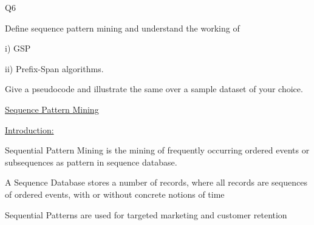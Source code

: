 \documentclass[12pt]{article}
\renewcommand{\_}{\kern-1.5pt\textunderscore\kern-1.5pt}
\begin{document}
\vspace{\baselineskip}
\begin{Center}
{\fontsize{28pt}{33.6pt}\selectfont Q6\par}
\end{Center}\par

{\fontsize{14pt}{16.8pt}\selectfont Define sequence pattern mining and understand the working of \par}\par

{\fontsize{14pt}{16.8pt}\selectfont i) GSP\par}\par

{\fontsize{14pt}{16.8pt}\selectfont ii) Prefix-Span algorithms.\par}\par

{\fontsize{14pt}{16.8pt}\selectfont Give a pseudocode and illustrate the same over a sample dataset of your choice.\par}\par


\vspace{\baselineskip}
{\fontsize{14pt}{16.8pt}\selectfont \uline{Sequence Pattern Mining}\par}\par

{\fontsize{14pt}{16.8pt}\selectfont \uline{Introduction:}\par}\par

Sequential Pattern Mining is the mining of frequently occurring ordered events or subsequences as pattern in sequence database.\par

A Sequence Database stores a number of records, where all records are sequences of ordered events, with or without concrete notions of time\par

Sequential Patterns are used for targeted marketing and customer retention\par
\end{document}
